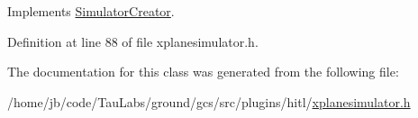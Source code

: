 \-Implements \hyperlink{group___h_i_t_l_plugin_ga2511a02773cadaf9c503a89172622837}{\-Simulator\-Creator}.



\-Definition at line 88 of file xplanesimulator.\-h.



\-The documentation for this class was generated from the following file\-:\begin{DoxyCompactItemize}
\item 
/home/jb/code/\-Tau\-Labs/ground/gcs/src/plugins/hitl/\hyperlink{xplanesimulator_8h}{xplanesimulator.\-h}\end{DoxyCompactItemize}
